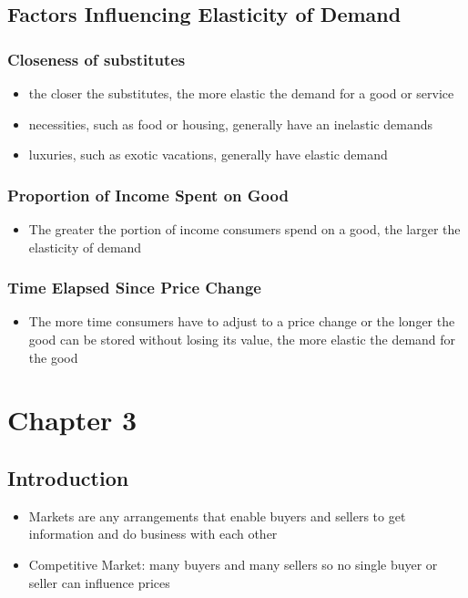 \documentclass[11pt]{article}
\begin{document}
\subsection{Factors Influencing Elasticity of Demand}
\label{sec:org6bdd649}
\subsubsection{Closeness of substitutes}
\label{sec:orgb174e7e}
\begin{itemize}
\item the closer the substitutes, the more elastic the demand for a good or service
\item necessities, such as food or housing, generally have an inelastic demands
\item luxuries, such as exotic vacations, generally have elastic demand
\end{itemize}
\subsubsection{Proportion of Income Spent on Good}
\label{sec:org7b46d9b}
\begin{itemize}
\item The greater the portion of income consumers spend on a good, the larger the elasticity of demand
\end{itemize}
\subsubsection{Time Elapsed Since Price Change}
\label{sec:org78e5488}
\begin{itemize}
\item The more time consumers have to adjust to a price change or the longer the good can be stored
without losing its value, the more elastic the demand for the good
\end{itemize}
\section{Chapter 3}
\label{sec:orge0b5682}
\subsection{Introduction}
\label{sec:org20da75e}
\begin{itemize}
\item Markets are any arrangements that enable buyers and sellers to get information
and do business with each other
\item Competitive Market: many buyers and many sellers so no single buyer or seller can
influence prices
\end{itemize}
\end{document}
